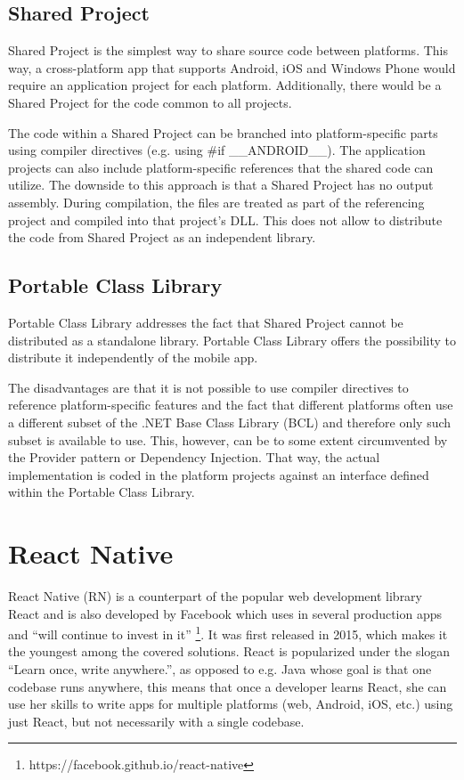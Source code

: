 \subsection{Shared Project}

Shared Project is the simplest way to share source code between platforms. This way, a cross-platform app that supports Android, iOS and Windows Phone would require an application project for each platform. Additionally, there would be a Shared Project for the code common to all projects.

The code within a Shared Project can be branched into platform-specific parts using compiler directives (e.g. using \#if \_\_ANDROID\_\_). The application projects can also include platform-specific references that the shared code can utilize.
The downside to this approach is that a Shared Project has no output assembly. During compilation, the files are treated as part of the referencing project and compiled into that project's DLL. This does not allow to distribute the code from Shared Project as an independent library.

\subsection{Portable Class Library}

Portable Class Library addresses the fact that Shared Project cannot be distributed as a standalone library. Portable Class Library offers the possibility to distribute it independently of the mobile app.

The disadvantages are that it is not possible to use compiler directives to reference platform-specific features and the fact that different platforms often use a different subset of the .NET Base Class Library (BCL) and therefore only such subset is available to use. This, however, can be to some extent circumvented by the Provider pattern or Dependency Injection. That way, the actual implementation is coded in the platform projects against an interface defined within the Portable Class Library.


\section{React Native}

React Native (RN) is a counterpart of the popular web development library React and is also developed by Facebook which uses in several production apps and ``will continue to invest in it'' \footnote{https://facebook.github.io/react-native}. It was first released in 2015, which makes it the youngest among the covered solutions. React is popularized under the slogan ``Learn once, write anywhere.'', as opposed to e.g. Java whose goal is that one codebase runs anywhere, this means that once a developer learns React, she can use her skills to write apps for multiple platforms (web, Android, iOS, etc.) using just React, but not necessarily with a single codebase.

